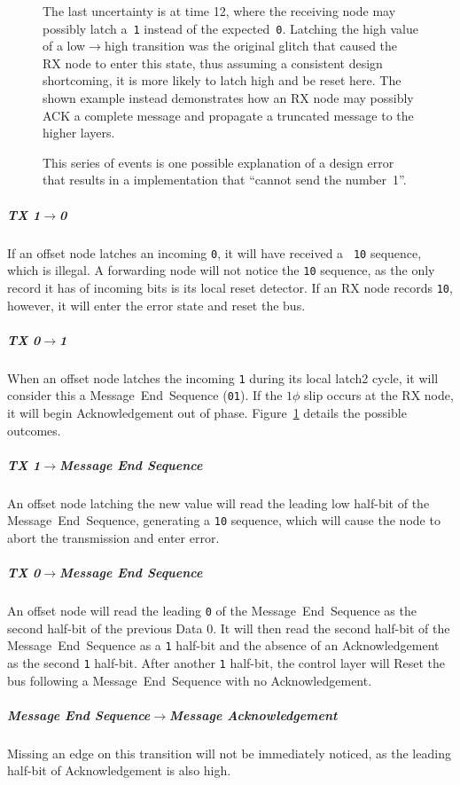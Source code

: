\begin{figure}[htb]
{    \hspace{1em}
    The last uncertainty is at time 12, where the receiving node may possibly
    latch a~{\tt 1} instead of the expected~{\tt 0}. Latching the high value
    of a low$\rightarrow$high transition was the original glitch that caused
    the RX node to enter this state, thus assuming a consistent design
    shortcoming, it is more likely to latch high and be reset here. The shown
    example instead demonstrates how an RX node may possibly ACK a complete
    message and propagate a truncated message to the higher layers.

    \hspace{1em}
    This series of events is one possible explanation of a design error that
    results in a \bus implementation that ``cannot send the number~1''.
  }
  \label{fig:1phi-1-0}
\end{figure}

\subparagraph{TX 1$\rightarrow$0}
If an offset node latches an incoming {\tt 0}, it will have received a {\tt
10} sequence, which is illegal. A forwarding node will not notice the {\tt 10}
sequence, as the only record it has of incoming bits is its local reset
detector. If an RX node records {\tt 10}, however, it will enter the {\sc
error} state and reset the bus.

\subparagraph{TX 0$\rightarrow$1}
When an offset node latches the incoming {\tt 1} during its local {\sc latch2}
cycle, it will consider this a Message~End~Sequence ({\tt 01}). If the $1\phi$
slip occurs at the RX node, it will begin Acknowledgement out of phase.
Figure~\ref{fig:1phi-1-0} details the possible outcomes.

\subparagraph{TX 1$\rightarrow$Message End Sequence}
An offset node latching the new value will read the leading low half-bit of
the Message~End~Sequence, generating a {\tt 10} sequence, which will cause the
node to abort the transmission and enter {\sc error}.

\subparagraph{TX 0$\rightarrow$Message End Sequence}
An offset node will read the leading {\tt 0} of the Message~End~Sequence as
the second half-bit of the previous Data 0. It will then read the second
half-bit of the Message~End~Sequence as a {\tt 1} half-bit and the absence of
an Acknowledgement as the second {\tt 1} half-bit. After another {\tt 1}
half-bit, the control layer will Reset the bus following a
Message~End~Sequence with no Acknowledgement.

\subparagraph{Message End Sequence$\rightarrow$Message Acknowledgement}
Missing an edge on this transition will not be immediately noticed, as the
leading half-bit of Acknowledgement is also high.

